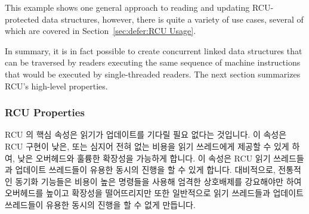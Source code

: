 This example shows one general approach to reading and updating
RCU-protected data structures, however, there is quite a variety
of use cases, several of which are covered in
Section~\ref{sec:defer:RCU Usage}.

In summary, it is in fact possible to create concurrent linked data
structures that can be traversed by readers executing the same sequence
of machine instructions that would be executed by single-threaded readers.
The next section summarizes RCU's high-level properties.

\fi

\subsubsection{RCU Properties}
\label{sec:defer:RCU Properties}

RCU 의 핵심 속성은 읽기가 업데이트를 기다릴 필요 없다는 것입니다.
이 속성은 RCU 구현이 낮은, 또는 심지어 전혀 없는 비용을 읽기 쓰레드에게 제공할
수 있게 하여, 낮은 오버헤드와 훌륭한 확장성을 가능하게 합니다.
이 속성은 RCU 읽기 쓰레드들과 업데이트 쓰레드들이 유용한 동시의 진행을 할 수
있게 합니다.
대비적으로, 전통적인 동기화 기능들은 비용이 높은 명령들을 사용해 엄격한
상호배제를 강요해야만 하여 오버헤드를 높이고 확장성을 떨어뜨리지만 또한
일반적으로 읽기 쓰레드들과 업데이트 쓰레드들이 유용한 동시의 진행을 할 수 없게
만듭니다.

